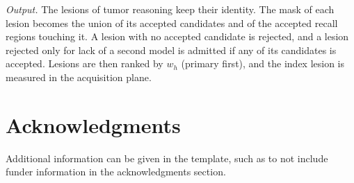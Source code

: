 \documentclass[fleqn,10pt]{olplainarticle}
\begin{document}
\textit{Output.} The lesions of tumor reasoning keep their identity. The mask of each lesion becomes the union of its
accepted candidates and of the accepted recall regions touching it. A lesion with no accepted candidate is rejected, and a
lesion rejected only for lack of a second model is admitted if any of its candidates is accepted. Lesions are then ranked by
$w_h$ (primary first), and the index lesion is measured in the acquisition plane.


\section*{Acknowledgments}

Additional information can be given in the template, such as to not include funder information in the acknowledgments section.


\end{document}
